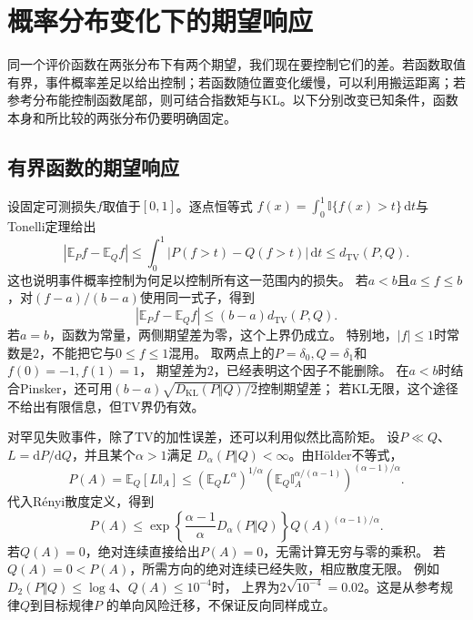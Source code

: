 \section{概率分布变化下的期望响应}
\label{sec:information-task-stability}
\label{sec:information-fixed-evaluation}

同一个评价函数在两张分布下有两个期望，我们现在要控制它们的差。若函数取值有界，事件概率差足以给出控制；若函数随位置变化缓慢，可以利用搬运距离；若参考分布能控制函数尾部，则可结合指数矩与KL。以下分别改变已知条件，函数本身和所比较的两张分布仍要明确固定。

\subsection{有界函数的期望响应}
\label{sec:information-bounded-evaluation}

设固定可测损失\(f\)取值于\([0,1]\)。逐点恒等式
\(f(x)=\int_0^1\mathbb I\{f(x)>t\}\,\mathrm dt\)与Tonelli定理给出
\[
  |\mathbb E_Pf-\mathbb E_Qf|
  \leq\int_0^1|P(f>t)-Q(f>t)|\,\mathrm dt
  \leq d_{\mathrm{TV}}(P,Q).
\]
这也说明事件概率控制为何足以控制所有这一范围内的损失。
若\(a<b\)且\(a\leq f\leq b\)，对\((f-a)/(b-a)\)使用同一式子，得到
\[
  |\mathbb E_Pf-\mathbb E_Qf|
  \leq(b-a)d_{\mathrm{TV}}(P,Q).
\]
若\(a=b\)，函数为常量，两侧期望差为零，这个上界仍成立。
特别地，\(|f|\leq1\)时常数是\(2\)，不能把它与\(0\leq f\leq1\)混用。
取两点上的\(P=\delta_0,Q=\delta_1\)和\(f(0)=-1,f(1)=1\)，
期望差为\(2\)，已经表明这个因子不能删除。
在\(a<b\)时结合Pinsker，还可用\((b-a)\sqrt{D_{\mathrm{KL}}(P\Vert Q)/2}\)控制期望差；
若KL无限，这个途径不给出有限信息，但TV界仍有效。

对罕见失败事件，除了TV的加性误差，还可以利用似然比高阶矩。
设\(P\ll Q\)、\(L=\mathrm dP/\mathrm dQ\)，并且某个\(\alpha>1\)满足
\(D_\alpha(P\Vert Q)<\infty\)。由H\"older不等式，
\[
  P(A)=\mathbb E_Q[L\mathbb I_A]
  \leq(\mathbb E_QL^\alpha)^{1/\alpha}
       (\mathbb E_Q\mathbb I_A^{\alpha/(\alpha-1)})^{(\alpha-1)/\alpha}.
\]
代入R\'enyi散度定义，得到
\begin{equation}
  P(A)\leq
  \exp\!\left\{\frac{\alpha-1}{\alpha}D_\alpha(P\Vert Q)\right\}
  Q(A)^{(\alpha-1)/\alpha}.
  \label{eq:information-renyi-event-bound}
\end{equation}
若\(Q(A)=0\)，绝对连续直接给出\(P(A)=0\)，无需计算无穷与零的乘积。
若\(Q(A)=0<P(A)\)，所需方向的绝对连续已经失败，相应散度无限。
例如\(D_2(P\Vert Q)\leq\log4\)、\(Q(A)\leq10^{-4}\)时，
上界为\(2\sqrt{10^{-4}}=0.02\)。这是从参考规律\(Q\)到目标规律\(P\)
的单向风险迁移，不保证反向同样成立。

